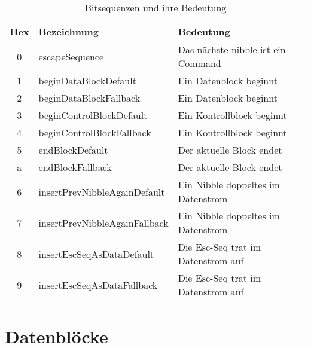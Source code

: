 \begin{table}[H]
    \center
    \def\arraystretch{1.3}
    \begin{tabular}{|c|l|l|l|}
        \rowcolor{gray!50}
        \hline
        \textbf{Hex} & \textbf{Bezeichnung}          & \textbf{Bedeutung}                 \\
        \hline
        0            & escapeSequence                & Das nächste nibble ist ein Command \\
        1            & beginDataBlockDefault         & Ein Datenblock beginnt             \\
        2            & beginDataBlockFallback        & Ein Datenblock beginnt             \\
        3            & beginControlBlockDefault      & Ein Kontrollblock beginnt          \\
        4            & beginControlBlockFallback     & Ein Kontrollblock beginnt          \\
        5            & endBlockDefault               & Der aktuelle Block endet           \\
        a            & endBlockFallback              & Der aktuelle Block endet           \\
        6            & insertPrevNibbleAgainDefault  & Ein Nibble doppeltes im Datenstrom \\
        7            & insertPrevNibbleAgainFallback & Ein Nibble doppeltes im Datenstrom \\
        8            & insertEscSeqAsDataDefault     & Die Esc-Seq trat im Datenstrom auf \\
        9            & insertEscSeqAsDataFallback    & Die Esc-Seq trat im Datenstrom auf \\
        \hline
    \end{tabular}
    \caption{Bitsequenzen und ihre Bedeutung}
    \label{tab:escape_sequences}
\end{table}

\section{Datenblöcke}